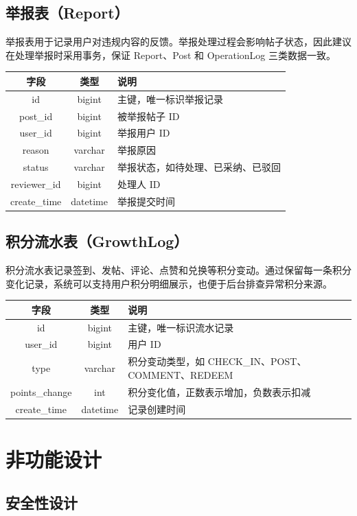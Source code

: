 \documentclass[bwprint]{report}
\begin{document}
\subsection{举报表（Report）}

举报表用于记录用户对违规内容的反馈。举报处理过程会影响帖子状态，因此建议在处理举报时采用事务，保证 Report、Post 和 OperationLog 三类数据一致。

\begin{longtable}{|c|c|p{7cm}|}
\hline
字段 & 类型 & 说明 \\
\hline
id & bigint & 主键，唯一标识举报记录 \\
post\_id & bigint & 被举报帖子 ID \\
user\_id & bigint & 举报用户 ID \\
reason & varchar & 举报原因 \\
status & varchar & 举报状态，如待处理、已采纳、已驳回 \\
reviewer\_id & bigint & 处理人 ID \\
create\_time & datetime & 举报提交时间 \\
\hline
\end{longtable}

\subsection{积分流水表（GrowthLog）}

积分流水表记录签到、发帖、评论、点赞和兑换等积分变动。通过保留每一条积分变化记录，系统可以支持用户积分明细展示，也便于后台排查异常积分来源。

\begin{longtable}{|c|c|p{7cm}|}
\hline
字段 & 类型 & 说明 \\
\hline
id & bigint & 主键，唯一标识流水记录 \\
user\_id & bigint & 用户 ID \\
type & varchar & 积分变动类型，如 CHECK\_IN、POST、COMMENT、REDEEM \\
points\_change & int & 积分变化值，正数表示增加，负数表示扣减 \\
create\_time & datetime & 记录创建时间 \\
\hline
\end{longtable}

\section{非功能设计}

\subsection{安全性设计}
\end{document}

